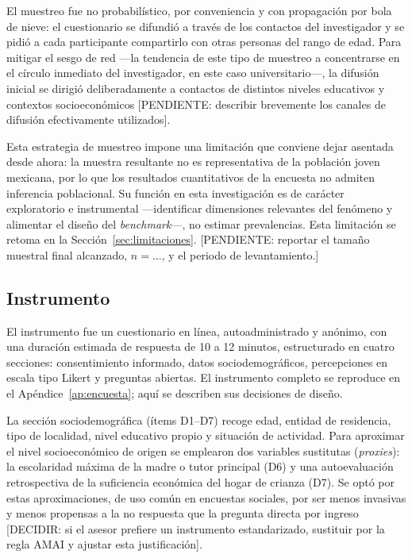 El muestreo fue no probabilístico, por conveniencia y con propagación por bola
de nieve: el cuestionario se difundió a través de los contactos del
investigador y se pidió a cada participante compartirlo con otras personas del
rango de edad. Para mitigar el sesgo de red ---la tendencia de este tipo de
muestreo a concentrarse en el círculo inmediato del investigador, en este caso
universitario---, la difusión inicial se dirigió deliberadamente a contactos
de distintos niveles educativos y contextos socioeconómicos
[PENDIENTE: describir brevemente los canales de difusión efectivamente
utilizados].

Esta estrategia de muestreo impone una limitación que conviene dejar asentada
desde ahora: la muestra resultante no es representativa de la población joven
mexicana, por lo que los resultados cuantitativos de la encuesta no admiten
inferencia poblacional. Su función en esta investigación es de carácter
exploratorio e instrumental ---identificar dimensiones relevantes del fenómeno
y alimentar el diseño del \emph{benchmark}---, no estimar prevalencias. Esta
limitación se retoma en la Sección~\ref{sec:limitaciones}.
[PENDIENTE: reportar el tamaño muestral final alcanzado, $n = \ldots$, y el
periodo de levantamiento.]

\subsection{Instrumento}
\label{sec:instrumento}

El instrumento fue un cuestionario en línea, autoadministrado y anónimo, con
una duración estimada de respuesta de 10 a 12 minutos, estructurado en cuatro
secciones: consentimiento informado, datos sociodemográficos, percepciones en
escala tipo Likert y preguntas abiertas. El instrumento completo se reproduce
en el Apéndice~\ref{ap:encuesta}; aquí se describen sus decisiones de diseño.

La sección sociodemográfica (ítems D1--D7) recoge edad, entidad de residencia,
tipo de localidad, nivel educativo propio y situación de actividad. Para
aproximar el nivel socioeconómico de origen se emplearon dos variables
sustitutas (\emph{proxies}): la escolaridad máxima de la madre o tutor
principal (D6) y una autoevaluación retrospectiva de la suficiencia económica
del hogar de crianza (D7). Se optó por estas aproximaciones, de uso común en
encuestas sociales, por ser menos invasivas y menos propensas a la no
respuesta que la pregunta directa por ingreso
[DECIDIR: si el asesor prefiere un instrumento estandarizado, sustituir por la
regla AMAI y ajustar esta justificación].

